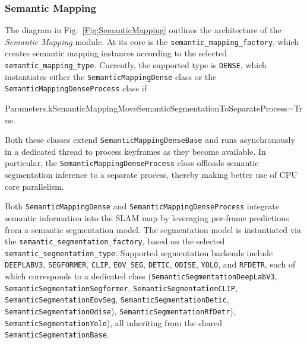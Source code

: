 \documentclass{article}
\newenvironment{Shaded}{\begin{snugshade}}{\end{snugshade}}
\newcommand{\NormalTok}[1]{\textcolor[rgb]{0.74,0.68,0.62}{#1}}
\begin{document}
\subsubsection{Semantic Mapping}

The diagram in Fig.~\ref{Fig:SemanticMapping} outlines the architecture of the \textit{Semantic Mapping} module. At its core is the \texttt{semantic\_mapping\_factory}, which creates semantic mapping instances according to the selected \texttt{semantic\_mapping\_type}. Currently, the supported type is \texttt{DENSE}, which instantiates either the \texttt{SemanticMappingDense} class or the \texttt{SemanticMappingDenseProcess} class if
\begin{scriptsize}
\begin{Shaded}
\begin{Highlighting}[]
\NormalTok{Parameters.kSemanticMappingMoveSemanticSegmentationToSeparateProcess=True}.
\end{Highlighting}
\end{Shaded}
\end{scriptsize}
Both these classes extend \texttt{SemanticMappingDenseBase} and runs asynchronously in a dedicated thread to process keyframes as they become available. In particular, the \texttt{SemanticMappingDenseProcess} class offloads semantic segmentation inference to a separate process, thereby making better use of CPU core parallelism.

Both \texttt{SemanticMappingDense} and \texttt{SemanticMappingDenseProcess} integrate semantic information into the SLAM map by leveraging per-frame predictions from a semantic segmentation model. The segmentation model is instantiated via the \texttt{semantic\_segmentation\_factory}, based on the selected \texttt{semantic\_segmentation\_type}. Supported segmentation backends include \texttt{DEEPLABV3}\cite{chen2017rethinking}, \texttt{SEGFORMER}\cite{xie2021segformer}, \texttt{CLIP}\cite{lin2023clip}, \texttt{EOV\_SEG}\cite{eov_seg}, \texttt{DETIC}\cite{detic}, \texttt{ODISE}\cite{odise}, \texttt{YOLO}\cite{redmon2016yolo,redmon2017yolo9000,redmon2018yolov3,bochkovskiy2020yolov4,jocher2020yolov5, wang2022yolov7, jocher2023yolov8, sapkota2025ultralytics}, and \texttt{RFDETR}\cite{rfdetr}, each of which corresponds to a dedicated class (\texttt{SemanticSegmentationDeepLabV3}, \texttt{SemanticSegmentationSegformer}, \texttt{SemanticSegmentationCLIP}, \texttt{SemanticSegmentationEovSeg}, \texttt{Semantic\-Segmentation\-Detic}, \texttt{Semantic\-Segmentation\-Odise}), \texttt{Semantic\-Segmentation\-RfDetr}), \texttt{Semantic\-Segmentation\-Yolo}), all inheriting from the shared \texttt{SemanticSegmentationBase}.
\end{document}
